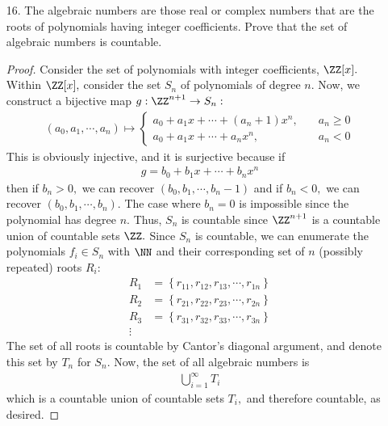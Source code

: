 \documentclass{article}
\begin{document}
\begin{itemize}
	\item[16.] The algebraic numbers are those real or complex numbers that are the roots of polynomials having integer coefficients. Prove that the set of algebraic numbers is countable.
		\begin{proof}
			Consider the set of polynomials with integer coefficients, $\ZZ[x].$ Within $\ZZ[x],$ consider the set $S_n$ of polynomials of degree $n.$ Now, we construct a bijective map $g:\ZZ^{n+1}\to S_n:$
			\begin{align*}
				(a_0, a_1, \cdots, a_n) \mapsto \begin{cases}
					a_0 + a_1x + \cdots + (a_n+1) x^n, \quad &a_n\ge 0 \\
					a_0+a_1x+\cdots+a_n x^n, \quad\quad &a_n<0	
				\end{cases}
			\end{align*}
			This is obviously injective, and it is surjective because if
			\begin{align*}
				g=b_0+b_1x+\cdots+b_n x^n
			\end{align*}
			then if $b_n>0,$ we can recover $(b_0, b_1, \cdots, b_n-1)$ and if $b_n<0,$ we can recover $(b_0, b_1, \cdots, b_n).$ The case where $b_n=0$ is impossible since the polynomial has degree $n.$ Thus, $S_n$ is countable since $\ZZ^{n+1}$ is a countable union of countable sets $\ZZ.$ Since $S_n$ is countable, we can enumerate the polynomials $f_i\in S_n$ with $\NN$ and their corresponding set of $n$ (possibly repeated) roots $R_i$:
			\begin{align*}
				R_1 &= \left\{ r_{11}, r_{12}, r_{13}, \cdots, r_{1n} \right\} \\
				R_2 &= \left\{ r_{21}, r_{22}, r_{23}, \cdots, r_{2n} \right\} \\
				R_3 &= \left\{ r_{31}, r_{32}, r_{33}, \cdots, r_{3n} \right\} \\
				\vdots
			\end{align*}
			The set of all roots is countable by Cantor's diagonal argument, and denote this set by $T_n$ for $S_n.$ Now, the set of all algebraic numbers is
			\begin{align*}
				\bigcup_{i=1}^\infty T_i
			\end{align*}
			which is a countable union of countable sets $T_i,$ and therefore countable, as desired.
		\end{proof}


\end{itemize}
\end{document}
